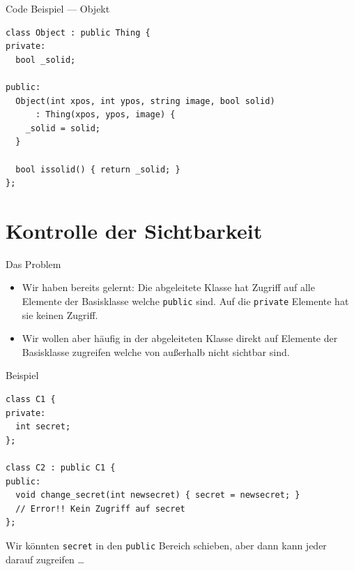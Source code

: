 \documentclass[presentation]{beamer}
\begin{document}
\begin{frame}[label={sec:org8a37043},fragile]{Code Beispiel --- Objekt}
 \begin{verbatim}
class Object : public Thing {
private:
  bool _solid;

public:
  Object(int xpos, int ypos, string image, bool solid)
      : Thing(xpos, ypos, image) {
    _solid = solid;
  }

  bool issolid() { return _solid; }
};
\end{verbatim}
\end{frame}
\section{Kontrolle der Sichtbarkeit}
\label{sec:org4d0ec08}
\begin{frame}[label={sec:org53b384d},fragile]{Das Problem}
 \begin{itemize}
\item Wir haben bereits gelernt: Die abgeleitete Klasse hat Zugriff auf
alle Elemente der Basisklasse welche {\color{solarizedYellow}\verb!public!} sind. Auf die
{\color{solarizedYellow}\verb!private!} Elemente hat sie \alert{keinen} Zugriff.
\item Wir wollen aber häufig in der abgeleiteten Klasse direkt auf
Elemente der Basisklasse zugreifen welche von außerhalb nicht
sichtbar sind.
\end{itemize}
\begin{exampleblock}{Beispiel}
\begin{verbatim}
class C1 {
private:
  int secret;
};

class C2 : public C1 {
public:
  void change_secret(int newsecret) { secret = newsecret; }
  // Error!! Kein Zugriff auf secret
};
\end{verbatim}
Wir könnten {\color{solarizedYellow}\verb!secret!} in den {\color{solarizedYellow}\verb!public!} Bereich schieben, aber dann kann
jeder darauf zugreifen \ldots{}
\end{exampleblock}
\end{frame}
\end{document}
